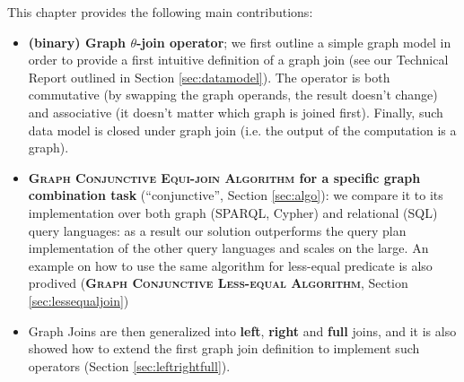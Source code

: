This chapter provides the following main contributions:

\begin{itemize}
	\item \textbf{(binary) Graph $\theta$-join operator}; we first outline a simple graph model in order to
	provide a first intuitive definition of a graph join (see our Technical Report \cite{BergamiMM16} outlined in
	Section \ref{sec:datamodel}). The operator is both commutative (by swapping the graph operands, the result doesn't change) and associative
	(it doesn't matter which graph is joined first).
	Finally, such data model is closed under graph join (i.e. the output of the computation is a graph).
	\item \textbf{\textsc{Graph Conjunctive Equi-join Algorithm} for a specific graph combination task} (``conjunctive'', Section \ref{sec:algo}): we
	compare it to its implementation
	over both graph  (SPARQL, Cypher) and relational (SQL) query languages: as a result our solution outperforms
	the query plan implementation of the other query languages and scales on the large. An example on how to use the same algorithm for less-equal predicate is also prodived (\textbf{\textsc{Graph Conjunctive Less-equal Algorithm}}, Section \ref{sec:lessequaljoin})
  \item Graph Joins are then generalized into \textbf{left}, \textbf{right} and \textbf{full} joins, and it is also showed how to extend the first graph join definition to implement such operators (Section \ref{sec:leftrightfull}).
\end{itemize}